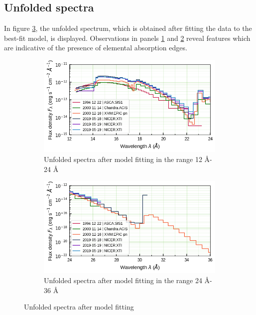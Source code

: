     \subsection{Unfolded spectra}
    In figure \ref{fig:all-uf}, the unfolded spectrum, which is obtained after fitting the data to the best-fit model, is displayed. Observations in panels \ref{fig:all-uf:12-24} and \ref{fig:all-uf:24-36} reveal features which are indicative of the presence of elemental absorption edges.
    
    \begin{figure}[!bht]
        \centering
        \begin{subfigure}[b]{0.45\textwidth}
            \includegraphics[width=\textwidth]{figures/eufspec/mr-vel-uf_all-obs_12-24.png}
            \caption{Unfolded spectra after model fitting in the range 12 \AA - 24 \AA}
            \label{fig:all-uf:12-24}
        \end{subfigure}
        \hfill
        \begin{subfigure}[b]{0.45\textwidth}
            \includegraphics[width=\textwidth]{figures/eufspec/mr-vel-uf_all-obs_24-36.png}
            \caption{Unfolded spectra after model fitting in the range 24 \AA - 36 \AA}
            \label{fig:all-uf:24-36}
        \end{subfigure}
        \caption{Unfolded spectra after model fitting}
        \label{fig:all-uf}
    \end{figure}

